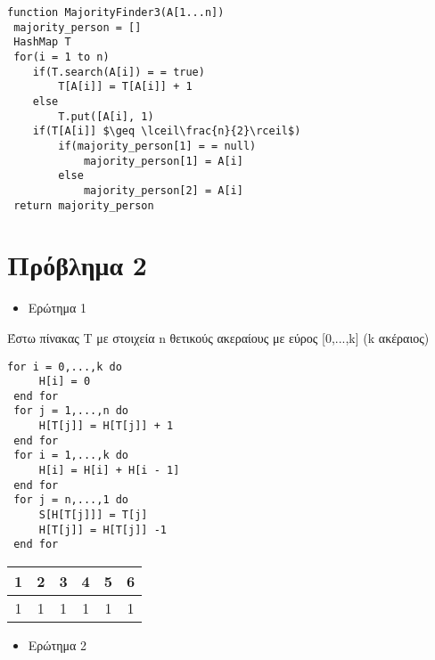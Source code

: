\documentclass[a4paper]{article}
\begin{document}
\begin{lstlisting}[mathescape]
function MajorityFinder3(A[1...n])
 majority_person = []
 HashMap T
 for(i = 1 to n)
 	if(T.search(A[i]) = = true)
 		T[A[i]] = T[A[i]] + 1
 	else 
 		T.put([A[i], 1)
 	if(T[A[i]] $\geq \lceil\frac{n}{2}\rceil$)
 		if(majority_person[1] = = null)
 			majority_person[1] = A[i]
 		else
 			majority_person[2] = A[i]
 return majority_person
\end{lstlisting}



\section*{Πρόβλημα 2}


\begin{itemize}
\item Ερώτημα 1
\end{itemize}

\lstset{frame=none}
\begin{tcolorbox}[colback=blue!20!white,colframe=purple!60!white,title=\textbf{Algorithm 1}]
Έστω πίνακας T με στοιχεία n θετικούς ακεραίους με εύρος [0,...,k] (k ακέραιος)
\begin{lstlisting}[mathescape]
 for i = 0,...,k do
	 H[i] = 0
 end for
 for j = 1,...,n do
	 H[T[j]] = H[T[j]] + 1
 end for
 for i = 1,...,k do
	 H[i] = H[i] + H[i - 1]
 end for
 for j = n,...,1 do
	 S[H[T[j]]] = T[j]
	 H[T[j]] = H[T[j]] -1
 end for
\end{lstlisting}
\end{tcolorbox}

\begin{tabular}{|c|c|c|c|c|c|}
1 & 2 & 3 & 4 & 5 & 6\\
\hline
1 & 1 & 1 & 1 & 1 & 1\\\hline
\end{tabular}


\begin{itemize}
\item Ερώτημα 2
\end{itemize}
\begin{lstlisting}[mathescape]

 \end{lstlisting}
\end{document}
